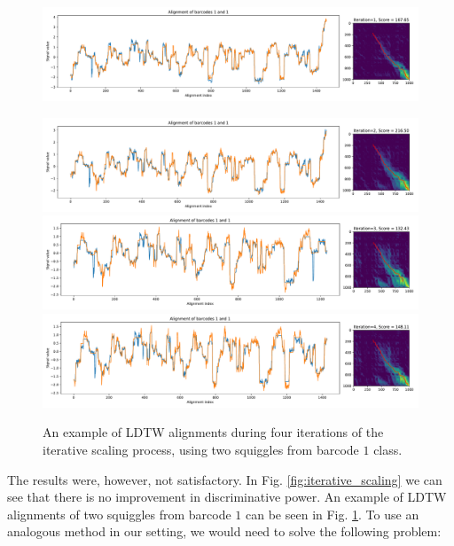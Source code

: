 \begin{figure}[ht] %
\includegraphics[scale=0.4]{images/scaling/bc1_bc1_1823_1416_it_1.pdf}

\includegraphics[scale=0.4]{images/scaling/bc1_bc1_1823_1416_it_2.pdf}
\includegraphics[scale=0.4]{images/scaling/bc1_bc1_1823_1416_it_3.pdf}
\includegraphics[scale=0.4]{images/scaling/bc1_bc1_1823_1416_it_4.pdf}

\caption[Iterative scaling example]{An example of LDTW alignments during four iterations of the iterative scaling process, using two squiggles from barcode $1$ class.} \label{fig:iterative_scaling_example}
\end{figure}


The results were, however, not satisfactory. In Fig. \ref{fig:iterative_scaling} we can see that there is no improvement in discriminative power. An example of LDTW alignments of two squiggles from barcode $1$ can be seen in Fig. \ref{fig:iterative_scaling_example}.
To use an analogous method in our setting, we would  need to solve the following problem:

